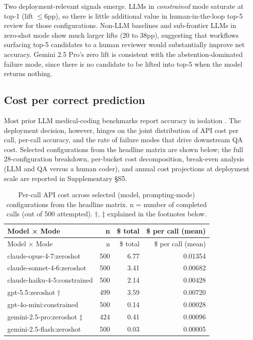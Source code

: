 Two deployment-relevant signals emerge. LLMs in \emph{constrained} mode
saturate at top-1 (lift $\leq$6pp), so there is little additional value
in human-in-the-loop top-5 review for those configurations.
Non-LLM baselines and sub-frontier LLMs in zero-shot mode show
much larger lifts (20 to 38pp), suggesting that workflows
surfacing top-5 candidates to a human reviewer would substantially
improve net accuracy. Gemini 2.5 Pro's zero lift is consistent
with the abstention-dominated failure mode, since there is no
candidate to be lifted into top-5 when the model returns nothing.

\subsection{Cost per correct prediction}\label{cost-per-correct-prediction}

Most prior LLM medical-coding benchmarks report accuracy in
isolation \autocite{Soroush2024,Almeida2025,Singh2025}. The deployment
decision, however, hinges on the joint distribution of API cost
per call, per-call accuracy, and the rate of failure modes that
drive downstream QA cost. Selected configurations from the
headline matrix are shown below; the full 28-configuration
breakdown, per-bucket cost decomposition, break-even analysis
(LLM and QA versus a human coder), and annual cost projections at
deployment scale are reported in Supplementary §S5.

\begin{longtable}[]{@{}lrrr@{}}
\caption{Per-call API cost across selected (model, prompting-mode) configurations from the headline matrix. n = number of completed calls (out of 500 attempted). †, ‡ explained in the footnotes below.}\tabularnewline
\toprule()
Model × Mode & n & \$ total & \$ per call (mean) \\
\midrule()
\endfirsthead
\toprule()
Model × Mode & n & \$ total & \$ per call (mean) \\
\midrule()
\endhead
claude-opus-4-7:zeroshot & 500 & 6.77 & 0.01354 \\
claude-sonnet-4-6:zeroshot & 500 & 3.41 & 0.00682 \\
claude-haiku-4-5:constrained & 500 & 2.14 & 0.00428 \\
gpt-5.5:zeroshot † & 499 & 3.59 & 0.00720 \\
gpt-4o-mini:constrained & 500 & 0.14 & 0.00028 \\
gemini-2.5-pro:zeroshot ‡ & 424 & 0.41 & 0.00096 \\
gemini-2.5-flash:zeroshot & 500 & 0.03 & 0.00005 \\
\bottomrule()
\end{longtable}

